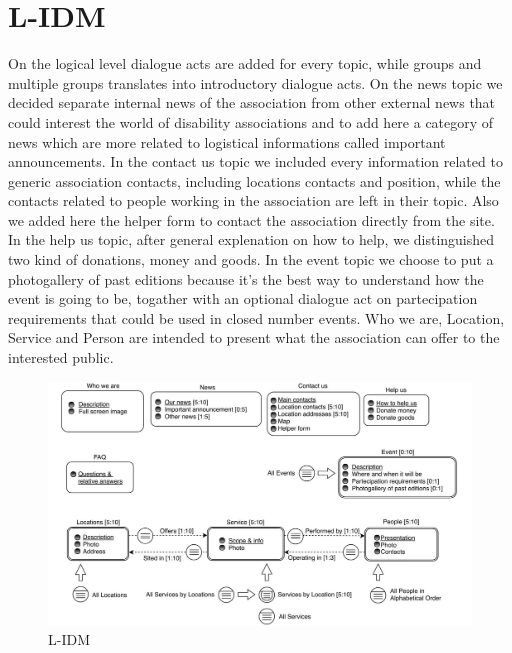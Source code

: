 \section{L-IDM}
On the logical level dialogue acts are added for every topic, while groups and multiple groups translates into introductory dialogue acts. On the news topic we decided separate internal news of the association from other external news that could interest the world of disability associations and to add here a category of news which are more related to logistical informations called important announcements. In the contact us topic we included every information related to generic association contacts, including locations contacts and position, while the contacts related to people working in the association are left in their topic. Also we added here the helper form to contact the association directly from the site. In the help us topic, after general explenation on how to help, we distinguished two kind of donations, money and goods. In the event topic we choose to put a photogallery of past editions because it's the best way to understand how the event is going to be, togather with an optional dialogue act on partecipation requirements that could be used in closed number events. Who we are, Location, Service and Person are intended to present what the association can offer to the interested public.
%
\begin{figure}[h]
\includegraphics[width=1.5\textwidth, center]{MainMatter/images/L-IDM.jpg}
\caption{L-IDM}
\label{fig:figure2}
\end{figure}
\newpage
%

